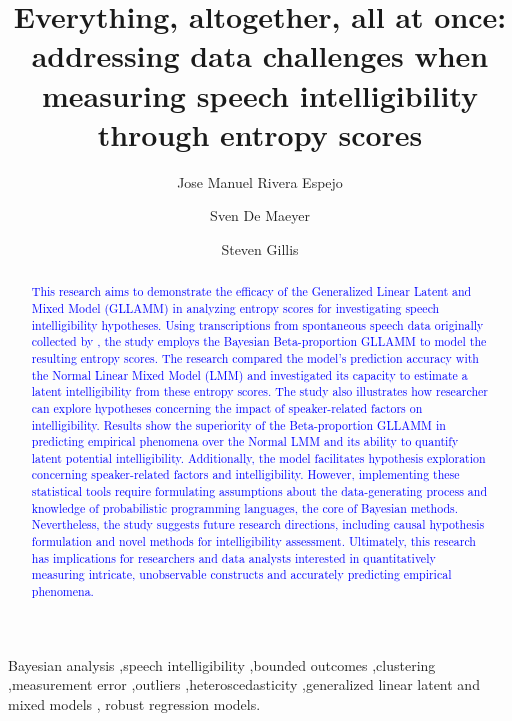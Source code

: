 \documentclass[
  authoryear,
  preprint,
  1p]{elsarticle}
\begin{document}
\begin{frontmatter}
\title{Everything, altogether, all at once: addressing data challenges
when measuring speech intelligibility through entropy scores}
\author[1]{Jose Manuel Rivera Espejo%
%
}
\author[1]{Sven De Maeyer%
%
}
\author[2]{Steven Gillis%
%
}





        
\begin{abstract}
\textcolor{blue}{This research aims to demonstrate the efficacy of the Generalized
Linear Latent and Mixed Model (GLLAMM)
\citep{Rabe_et_al_2004a, Rabe_et_al_2004b, Rabe_et_al_2004c, Skrondal_et_al_2004a}
in analyzing entropy scores for investigating speech intelligibility
hypotheses. Using transcriptions from spontaneous speech data originally
collected by \citet{Boonen_et_al_2021}, the study employs the Bayesian
Beta-proportion GLLAMM to model the resulting entropy scores. The
research compared the model's prediction accuracy with the Normal Linear
Mixed Model (LMM) \citep{Holmes_et_al_2019} and investigated its
capacity to estimate a latent intelligibility from these entropy scores.
The study also illustrates how researcher can explore hypotheses
concerning the impact of speaker-related factors on intelligibility.
Results show the superiority of the Beta-proportion GLLAMM in predicting
empirical phenomena over the Normal LMM and its ability to quantify
latent potential intelligibility. Additionally, the model facilitates
hypothesis exploration concerning speaker-related factors and
intelligibility. However, implementing these statistical tools require
formulating assumptions about the data-generating process and knowledge
of probabilistic programming languages, the core of Bayesian methods.
Nevertheless, the study suggests future research directions, including
causal hypothesis formulation and novel methods for intelligibility
assessment. Ultimately, this research has implications for researchers
and data analysts interested in quantitatively measuring intricate,
unobservable constructs and accurately predicting empirical phenomena.}
\end{abstract}





\begin{keyword}
    Bayesian analysis \sep speech intelligibility \sep bounded
outcomes \sep clustering \sep measurement
error \sep outliers \sep heteroscedasticity \sep generalized linear
latent and mixed models \sep 
    robust regression models.
\end{keyword}
\end{frontmatter}
\end{document}
